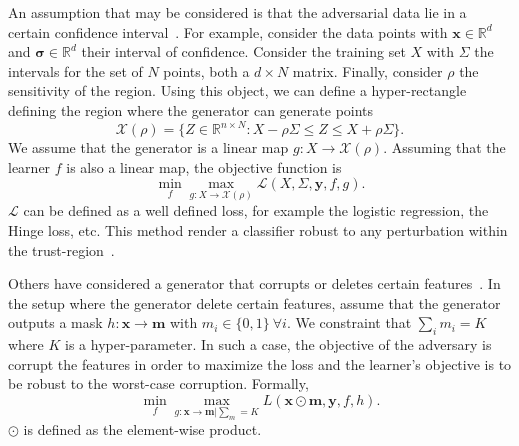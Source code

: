 An assumption that may be considered is that the adversarial data lie in a certain confidence interval~\cite{Ghaoui_robust_classification,Lanckriet_robust_minimax}. For example, consider the data points with $\bm x\in\mathbb{R}^d$ and $\bm\sigma\in\mathbb{R}^d$ their interval of confidence. Consider the training set $X$ with $\Sigma$ the intervals for the set of $N$ points, both a $d\times N$ matrix. Finally, consider $\rho$ the sensitivity of the region. Using this object, we can define a hyper-rectangle defining the region where the generator can generate points
\[
\mathcal{X}(\rho) = \{Z\in\mathbb{R}^{n\times N}: X-\rho\Sigma\leq Z\leq X+\rho\Sigma\}.
\]
We assume that the generator is a linear map $g:X\to\mathcal{X}(\rho)$. Assuming that the learner $f$ is also a linear map, the objective function is
\[
\min_f\max_{g:X\to\mathcal{X}(\rho)}\mathcal{L}(X, \Sigma, \bm y, f, g).
\]
$\mathcal{L}$ can be defined as a well defined loss, for example the logistic regression, the Hinge loss, etc. This method render a classifier robust to any perturbation within the trust-region~\cite{Ghaoui_robust_classification}.

Others have considered a generator that corrupts or deletes certain features~\cite{Globerson_robust_deletion,dekel_corrupted_learning}. In the setup where the generator delete certain features, assume that the generator outputs a mask $h:\bm x\to \bm m$ with $m_i\in\{0,1\}~\forall i$. We constraint that $\sum_i m_i = K$ where $K$ is a hyper-parameter. In such a case, the objective of the adversary is corrupt the features in order to maximize the loss and the learner's objective is to be robust to the worst-case corruption. Formally,
\[
\min_f\max_{g:\bm x\to\bm m|\sum_m=K}L(\bm x\odot \bm m, \bm y, f, h).
\]
$\odot$ is defined as the element-wise product. 

